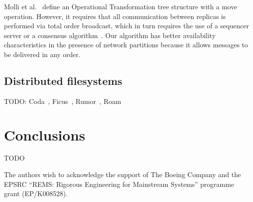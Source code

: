 \documentclass[sigconf]{acmart}
\begin{document}
Molli et al.~\cite{Molli:2003cd} define an Operational Transformation tree structure with a move operation.
However, it requires that all communication between replicas is performed via total order broadcast, which in turn requires the use of a sequencer server or a consensus algorithm~\cite{Chandra:1996cp}.
Our algorithm has better availability characteristics in the presence of network partitions because it allows messages to be delivered in any order.

\subsection{Distributed filesystems}

TODO: Coda~\cite{Kumar:1995wf}, Ficus~\cite{Reiher:1994wh}, Rumor~\cite{Guy:1999gy}, Roam~\cite{Ratner:1999fh}

\section{Conclusions}

TODO

\begin{acks}
The authors wish to acknowledge the support of The Boeing Company and the EPSRC ``REMS: Rigorous Engineering for Mainstream Systems'' programme grant (EP/K008528).
\end{acks}


{}
\end{document}
